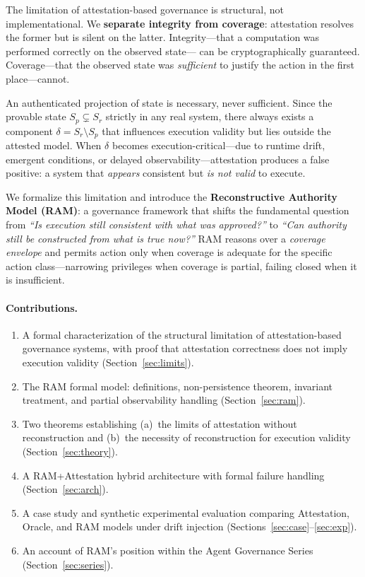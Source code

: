 \documentclass[11pt]{article}
\newcommand{\Sr}{S_r}
\newcommand{\Sp}{S_p}
\begin{document}
The limitation of attestation-based governance is structural, not implementational.
We \textbf{separate integrity from coverage}: attestation resolves the former
but is silent on the latter.
Integrity---that a computation was performed correctly on the observed state---
can be cryptographically guaranteed.
Coverage---that the observed state was \emph{sufficient} to justify the action
in the first place---cannot.

An authenticated projection of state is necessary, never sufficient.
Since the provable state $\Sp \subsetneq \Sr$ strictly in any real system,
there always exists a component $\delta = \Sr \setminus \Sp$ that influences
execution validity but lies outside the attested model.
When $\delta$ becomes execution-critical---due to runtime drift, emergent
conditions, or delayed observability---attestation produces a false positive:
a system that \emph{appears} consistent but \emph{is not valid} to execute.

We formalize this limitation and introduce the \textbf{Reconstructive Authority
Model (RAM)}: a governance framework that shifts the fundamental question from
\emph{``Is execution still consistent with what was approved?''} to
\emph{``Can authority still be constructed from what is true now?''}
RAM reasons over a \emph{coverage envelope} and permits action only when
coverage is adequate for the specific action class---narrowing privileges when
coverage is partial, failing closed when it is insufficient.

\paragraph{Contributions.}
\begin{enumerate}[leftmargin=*, label=(\roman*)]
  \item A formal characterization of the structural limitation of attestation-based
        governance systems, with proof that attestation correctness does not imply
        execution validity (Section~\ref{sec:limits}).
  \item The RAM formal model: definitions, non-persistence theorem, invariant
        treatment, and partial observability handling (Section~\ref{sec:ram}).
  \item Two theorems establishing (a)~the limits of attestation without
        reconstruction and (b)~the necessity of reconstruction for execution
        validity (Section~\ref{sec:theory}).
  \item A RAM+Attestation hybrid architecture with formal failure handling
        (Section~\ref{sec:arch}).
  \item A case study and synthetic experimental evaluation comparing
        Attestation, Oracle, and RAM models under drift injection
        (Sections~\ref{sec:case}--\ref{sec:exp}).
  \item An account of RAM's position within the Agent Governance Series
        (Section~\ref{sec:series}).
\end{enumerate}
\end{document}
